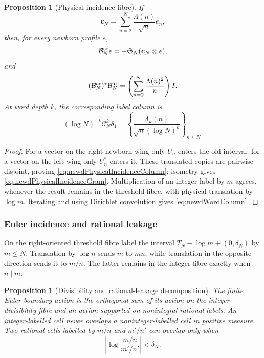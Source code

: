 \documentclass[11pt]{amsart}
\newtheorem{proposition}[theorem]{Proposition}
\theoremstyle{definition}
\theoremstyle{remark}
\begin{document}
\begin{proposition}[Physical incidence fibre]
\label{prop:newdPhysicalIncidence}
If
\[
 \mathbf c_N=\sum_{n=2}^N\frac{\Lambda(n)}{\sqrt n}e_n,
\]
then, for every newborn profile $e$,
\begin{equation}\label{eq:newdPhysicalIncidenceColumn}
 \mathcal B_N^{\rm ar}e=-\mathfrak S_N(\mathbf c_N\otimes e),
\end{equation}
and
\begin{equation}\label{eq:newdPhysicalIncidenceGram}
 (\mathcal B_N^{\rm ar})^*\mathcal B_N^{\rm ar}
 =\left(\sum_{n=2}^N\frac{\Lambda(n)^2}{n}\right)I.
\end{equation}
At word depth $k$, the corresponding label column is
\begin{equation}\label{eq:newdWordColumn}
 (\log N)^{-k}\mathscr C_N^k\delta_1
 =\left\{\frac{\Lambda_k(n)}
                {\sqrt n(\log N)^k}\right\}_{n\leq N}.
\end{equation}
\end{proposition}

\begin{proof}
For a vector on the right newborn wing only $U_n$ enters the old interval;
for a vector on the left wing only $U_n^*$ enters it.  These translated
copies are pairwise disjoint, proving
\eqref{eq:newdPhysicalIncidenceColumn}; isometry gives
\eqref{eq:newdPhysicalIncidenceGram}.  Multiplication of an integer label by
$m$ agrees, whenever the result remains in the threshold fibre, with
physical translation by $\log m$.  Iterating and using Dirichlet convolution
gives \eqref{eq:newdWordColumn}.
\end{proof}

\subsubsection{Euler incidence and rational leakage}

On the right-oriented threshold fibre label the interval
$T_N-\log m+(0,\delta_N)$ by $m\leq N$.  Translation by $\log n$ sends
$m$ to $mn$, while translation in the opposite direction sends it to
$m/n$.  The latter remains in the integer fibre exactly when $n\mid m$.

\begin{proposition}[Divisibility and rational-leakage decomposition]
\label{prop:newdLeakageSplit}
The finite Euler boundary action is the orthogonal sum of its action on the
integer divisibility fibre and an action supported on nonintegral rational
labels.  An integer-labelled cell never overlaps a noninteger-labelled cell
in positive measure.  Two rational cells labelled by $m/n$ and $m'/n'$ can
overlap only when
\begin{equation}\label{eq:newdOverlapCondition}
 \left|\log\frac{m/n}{m'/n'}\right|<\delta_N.
\end{equation}
\end{proposition}
\end{document}
